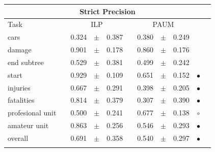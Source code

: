 \begin{table}[ht!]
\centering 
\begin{tabular}
{lcrclcrcl@{\hspace{0.1cm}}cc}

\multicolumn{11}{c}{Strict Precision}\\
\hline
Task && \multicolumn{3}{c}{ILP}  && \multicolumn{3}{c}{PAUM} && \\
\hline
              cars &&      0.324 &  $\pm$  &       0.387 & &      0.380 &  $\pm$  &       0.249 &  \\
            damage &&      0.901 &  $\pm$  &       0.178 & &      0.860 &  $\pm$  &       0.176 &  \\
       end subtree &&      0.529 &  $\pm$  &       0.381 & &      0.499 &  $\pm$  &       0.242 &  \\
             start &&      0.929 &  $\pm$  &       0.109 & &      0.651 &  $\pm$  &       0.152 & $\bullet$ \\
          injuries &&      0.667 &  $\pm$  &       0.291 & &      0.398 &  $\pm$  &       0.205 & $\bullet$ \\
        fatalities &&      0.814 &  $\pm$  &       0.379 & &      0.307 &  $\pm$  &       0.390 & $\bullet$ \\
  profesional unit &&      0.500 &  $\pm$  &       0.241 & &      0.677 &  $\pm$  &       0.138 & $\circ$ \\
      amateur unit &&      0.863 &  $\pm$  &       0.256 & &      0.546 &  $\pm$  &       0.293 & $\bullet$ \\
\hline
           overall &&      0.691 &  $\pm$  &       0.358 & &      0.540 &  $\pm$  &       0.297 & $\bullet$ \\
\hline
\\


\end{tabular}
\end{table}
